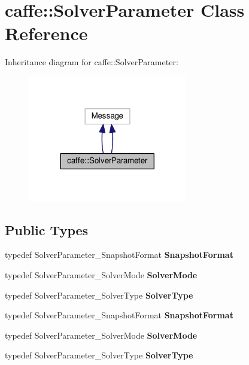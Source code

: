 \hypertarget{classcaffe_1_1_solver_parameter}{}\section{caffe\+:\+:Solver\+Parameter Class Reference}
\label{classcaffe_1_1_solver_parameter}


Inheritance diagram for caffe\+:\+:Solver\+Parameter\+:
\nopagebreak
\begin{figure}[H]
\begin{center}
\leavevmode
\includegraphics[width=197pt]{classcaffe_1_1_solver_parameter__inherit__graph}
\end{center}
\end{figure}
\subsection*{Public Types}
\begin{DoxyCompactItemize}
\item 
\mbox{\label{classcaffe_1_1_solver_parameter_a3af1b8141446a584cae87abd6790146f}} 
typedef Solver\+Parameter\+\_\+\+Snapshot\+Format {\bfseries Snapshot\+Format}
\item 
\mbox{\label{classcaffe_1_1_solver_parameter_ae076a69c1f5611691777bf75a33b91a9}} 
typedef Solver\+Parameter\+\_\+\+Solver\+Mode {\bfseries Solver\+Mode}
\item 
\mbox{\label{classcaffe_1_1_solver_parameter_ac523700fd233586dab13ff4284910832}} 
typedef Solver\+Parameter\+\_\+\+Solver\+Type {\bfseries Solver\+Type}
\item 
\mbox{\label{classcaffe_1_1_solver_parameter_a3af1b8141446a584cae87abd6790146f}} 
typedef Solver\+Parameter\+\_\+\+Snapshot\+Format {\bfseries Snapshot\+Format}
\item 
\mbox{\label{classcaffe_1_1_solver_parameter_ae076a69c1f5611691777bf75a33b91a9}} 
typedef Solver\+Parameter\+\_\+\+Solver\+Mode {\bfseries Solver\+Mode}
\item 
\mbox{\label{classcaffe_1_1_solver_parameter_ac523700fd233586dab13ff4284910832}} 
typedef Solver\+Parameter\+\_\+\+Solver\+Type {\bfseries Solver\+Type}
\end{DoxyCompactItemize}
